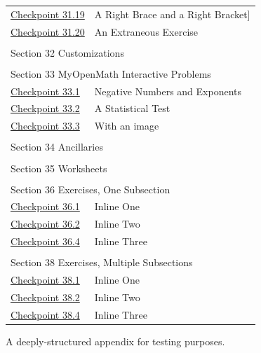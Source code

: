 \documentclass{sn-jnl}
\theoremstyle{thmstyleone}%
\theoremstyle{thmstyletwo}%
\theoremstyle{thmstylethree}%
\numberwithin{equation}{section}
\begin{document}
\begin{appendices}
\begin{longtable}[l]{ll}
\hyperref[exercise-difficult-title]{Checkpoint 31.19}& A Right Brace \textbraceright{} and a Right Bracket]\\
\hyperref[section-advanced-numbering-12-2]{Checkpoint 31.20}& An Extraneous Exercise\\
\multicolumn{2}{l}{\null}\\[1.5ex] \multicolumn{2}{l}{\large Section 32 Customizations}\\[0.5ex]
\multicolumn{2}{l}{\null}\\[1.5ex] \multicolumn{2}{l}{\large Section 33 MyOpenMath Interactive Problems}\\[0.5ex]
\hyperref[section-myopenmath-3]{Checkpoint 33.1}& Negative Numbers and Exponents\\
\hyperref[section-myopenmath-4]{Checkpoint 33.2}& A Statistical Test\\
\hyperref[section-myopenmath-5]{Checkpoint 33.3}& With an image\\
\multicolumn{2}{l}{\null}\\[1.5ex] \multicolumn{2}{l}{\large Section 34 Ancillaries}\\[0.5ex]
\multicolumn{2}{l}{\null}\\[1.5ex] \multicolumn{2}{l}{\large Section 35 Worksheets}\\[0.5ex]
\multicolumn{2}{l}{\null}\\[1.5ex] \multicolumn{2}{l}{\large Section 36 Exercises, One Subsection}\\[0.5ex]
\hyperref[section-exercises-single-5]{Checkpoint 36.1}& Inline One\\
\hyperref[duplicate-inline]{Checkpoint 36.2}& Inline Two\\
\hyperref[section-exercises-single-9]{Checkpoint 36.4}& Inline Three\\
\multicolumn{2}{l}{\null}\\[1.5ex] \multicolumn{2}{l}{\large Section 38 Exercises, Multiple Subsections}\\[0.5ex]
\hyperref[section-exercises-multiple-3-2]{Checkpoint 38.1}& Inline One\\
\hyperref[section-exercises-multiple-3-4]{Checkpoint 38.2}& Inline Two\\
\hyperref[exercise-duplicate-inline]{Checkpoint 38.4}& Inline Three\\
\end{longtable}
%
%
\typeout{************************************************}
\typeout{************************************************}
%
\label{appendix-structured}%
A deeply-structured appendix for testing purposes.%
%
%
\typeout{************************************************}
\typeout{************************************************}
%

\end{appendices}
\end{document}
